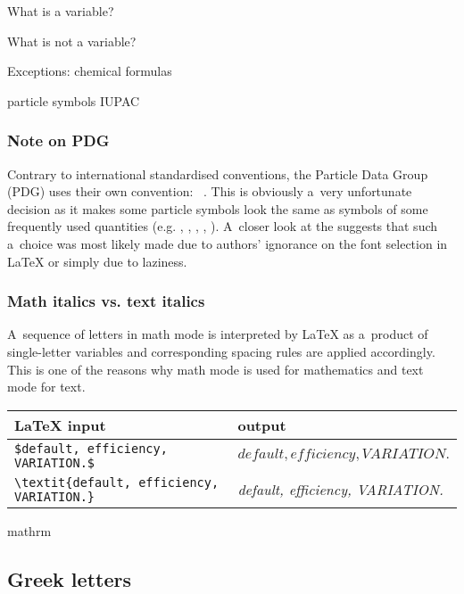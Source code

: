 \documentclass[12pt,a4paper]{article}
\begin{document}
What is a variable?

What is not a variable?

Exceptions: chemical formulas


particle symbols
IUPAC~\cite[Secs. 1.6, 2.10.1 (ii)]{iupac-green-book}

\subsubsection{Note on PDG}

Contrary to international standardised conventions, the Particle Data Group (PDG) uses their own convention: ~\cite[p. 15]{pdg-2018}.
This is obviously a~very unfortunate decision as it makes some particle symbols look the same as symbols of some frequently used quantities (e.g. , , , , ).
A~closer look at the  suggests that such a~choice was most likely made due to authors' ignorance on the font selection in \LaTeX{} or simply due to laziness.

\subsubsection{Math italics vs. text italics}

A~sequence of letters in math mode is interpreted by \LaTeX{} as a~product of single-letter variables and corresponding spacing rules are applied accordingly.
This is one of the reasons why math mode is used for mathematics and text mode for text.

\begin{center}
\begin{tabular}{|l|l|}
\hline
\LaTeX{} input & output \\
\hline
\verb_$default, efficiency, VARIATION.$_ & $default, efficiency, VARIATION.$ \\
\verb_\textit{default, efficiency, VARIATION.}_ & \textit{default, efficiency, VARIATION.} \\
\hline
\end{tabular}
\end{center}

mathrm

\subsection{Greek letters}
\label{sec:greek}
\end{document}
